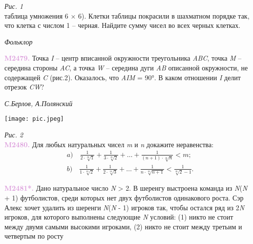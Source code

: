 \begin{multicols}{2}
\textit{Рис. 1} \\
таблица умножения 6 × 6). Клетки таблицы 
покрасили в шахматном порядке так,
что клетка с числом 1 – черная. Найдите
сумму чисел во всех черных клетках.
\vspace{-0.8em}
\begin{flushright}
    \textit{Фольклор} \\
\end{flushright}

\noindent
\textcolor{Plum}{\textbf{M2479.}}
Точка \textit{I} – центр вписанной окружности 
треугольника \textit{ABC}, точка \textit{M} – середина 
стороны \textit{AC}, а точка \textit{W} – середина дуги 
\textit{AB} описанной окружности, не содержащей 
\textit{C} (рис.2). Оказалось, что \textit{\angle}\textit{AIM} = 90°. 
В каком отношении \textit{I} делит отрезок \textit{CW}?
\vspace{-0.8em}
\begin{flushright}
    \textit{С.Берлов, А.Полянский} \\
\end{flushright}

\begin{center}
    \texttt{[image: pic.jpeg]}
\end{center}

\textit{Рис. 2} \\
\noindent
\textcolor{Plum}{\textbf{M2480.}}
Для любых натуральных чисел \textit{m}
и \textit{n} докажите неравенства: \\
\noindent
\vspace{-1.5em}
\begin{align*}
    &a)\quad \frac{1}{2 \cdot \sqrt[m]{1}} + 
    \frac{1}{3 \cdot \sqrt[m]{2}} + 
    \dots +
    \frac{1}{(n + 1) \cdot \sqrt[m]{n}} < m; \\
    &b)\quad \frac{1}{1 \cdot \sqrt[m]{2}} + 
    \frac{1}{2 \cdot \sqrt[m]{3}} + 
    \dots +
    \frac{1}{n \cdot \sqrt[m]{n + 1}} < \frac{1}{\sqrt[m]{2} - 1}.
\end{align*}

\noindent
\textcolor{Plum}{\textbf{M2481*.}}
Дано натуральное число \textit{N} > 2. В
шеренгу выстроена команда из \textit{N}(\textit{N} + 1)
футболистов, среди которых нет двух
футболистов одинакового роста. Сэр Алекс
хочет удалить из шеренги \textit{N}(\textit{N} - 1) 
игроков так, чтобы остался ряд из 2\textit{N} игроков,
для которого выполнены следующие \textit{N}
условий: (1) никто не стоит между двумя
самыми высокими игроками, (2) никто не
стоит между третьим и четвертым по росту
\end{multicols}

